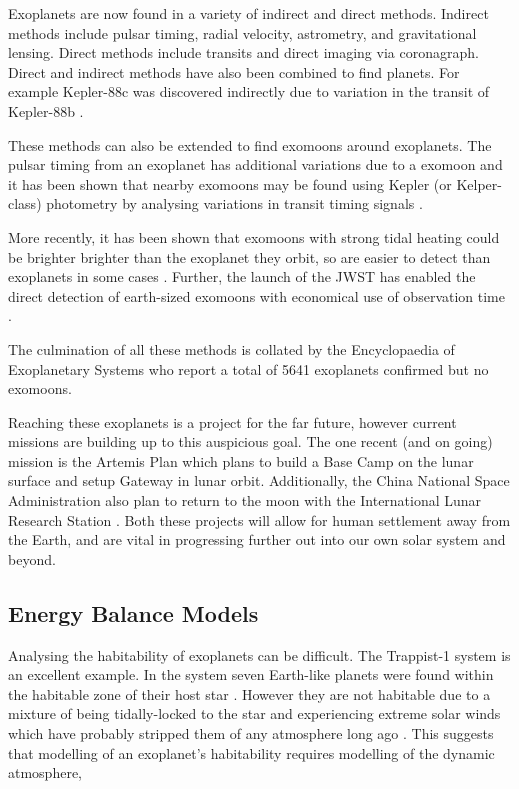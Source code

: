\documentclass[12pt, onecolumn]{revtex4-2}    %
\begin{document}
Exoplanets are now found in a variety of indirect and direct methods.
Indirect methods include pulsar timing, radial velocity, astrometry, and gravitational lensing.
Direct methods include transits and direct imaging via coronagraph.
Direct and indirect methods have also been combined to find planets. 
For example Kepler-88c was discovered indirectly due to variation in the transit of Kepler-88b \cite{Nesvorny2013}.

These methods can also be extended to find exomoons around exoplanets.
The pulsar timing from an exoplanet has additional variations due to a exomoon \cite{Lewis2008} and it has been shown that nearby exomoons may be found using Kepler (or Kelper-class) photometry by analysing variations in transit timing signals \cite{KSG2009}.

More recently, it has been shown that exomoons with strong tidal heating could be brighter brighter than the exoplanet they orbit, so are easier to detect than exoplanets in some cases \cite{LimTurn2013}.
Further, the launch of the JWST has enabled the direct detection of earth-sized exomoons with economical use of observation time \cite{Limbach2021}.

The culmination of all these methods is collated by the Encyclopaedia of Exoplanetary Systems \cite{ExoEu} who report a total of 5641 exoplanets confirmed but no exomoons.

Reaching these exoplanets is a project for the far future, however current missions are building up to this auspicious goal.
The one recent (and on going) mission is the Artemis Plan \cite{NASA_Artemis} which plans to build a Base Camp on the lunar surface and setup Gateway in lunar orbit.
Additionally, the China National Space Administration also plan to return to the moon with the International Lunar Research Station \cite{CNSA_ILRS}.
Both these projects will allow for human settlement away from the Earth, and are vital in progressing further out into our own solar system and beyond.

\subsection{Energy Balance Models} \label{ssec:EBM_intro}
Analysing the habitability of exoplanets can be difficult.
The Trappist-1 system is an excellent example. In the system seven Earth-like planets were found within the habitable zone of their host star \cite{GTD2017}.
However they are not habitable due to a mixture of being tidally-locked to the star and experiencing extreme solar winds which have probably stripped them of any atmosphere long ago \cite{Cohen2024, VanLooveren2024}.
This suggests that modelling of an exoplanet's habitability requires modelling of the dynamic atmosphere,
\end{document}
